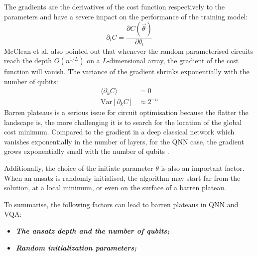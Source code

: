 The gradients are the derivatives of the cost function respectively to the parameters and have a severe impact on the performance of the training model:
\begin{equation}
    \partial_l C = \frac{\partial C(\vec{\theta})}{\partial\theta_l}
\end{equation}
McClean et al. \cite{mccleanBarrenPlateausQuantum2018} also pointed out that whenever the random parameterised circuits reach the depth $O(n^{1/L})$ on a $L$-dimensional array, the gradient of the cost function will vanish.
The variance of the gradient shrinks exponentially with the number of qubits:
\begin{align}
    \langle \partial_k C\rangle &= 0  \label{Vanish Gradient}\\
    \mathrm{Var}[\partial_k C] &\approx 2^{-n}  \label{Variance expo smaller}
\end{align}
Barren plateaus is a serious issue for circuit optimisation because the flatter the landscape is, the more challenging it is to search for the location of the global cost minimum.
Compared to the gradient in a deep classical network which vanishes exponentially in the number of layers, for the QNN case, the gradient grows exponentially small with the number of qubits \cite{mccleanBarrenPlateausQuantum2018}.

Additionally, the choice of the initiate parameter $\theta$ is also an important factor. When an ansatz is randomly initialised, the algorithm may start far from the solution, at a local minimum, or even on the surface of a barren plateau. 

To summarise, the following factors can lead to barren plateaus in QNN and VQA:
\begin{itemize}
    \item \textbf{\emph{The ansatz depth and the number of qubits;}}
    \item \textbf{\emph{Random initialization parameters;}}
\end{itemize}

